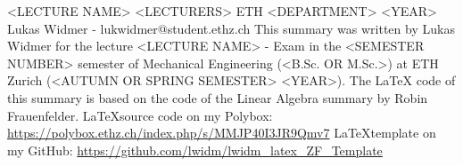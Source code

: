 \raggedbottom
\raggedright
\raggedcolumns
\begin{multicols*}{4}



	\DocumentInfo
	{<LECTURE NAME>} %
	{<LECTURERS> \newline
		ETH <DEPARTMENT> <YEAR> \newline
		Lukas Widmer - lukwidmer@student.ethz.ch} %
	{This summary was written by Lukas Widmer for the lecture <LECTURE NAME> - Exam in the <SEMESTER NUMBER> semester of Mechanical Engineering (<B.Sc. OR M.Sc.>) at ETH Zurich (<AUTUMN OR SPRING SEMESTER> <YEAR>). \vspace{1mm}\newline
		The LaTeX code of this summary is based on the code of the Linear Algebra summary by Robin Frauenfelder. \vspace{1mm} \newline
		\LaTeX  source code on my Polybox: \newline \url{https://polybox.ethz.ch/index.php/s/MMJP40I3JR9Qmv7} \newline
		\LaTeX  template on my GitHub: \newline \url{https://github.com/lwidm/lwidm_latex_ZF_Template}}


	





\end{multicols*}



